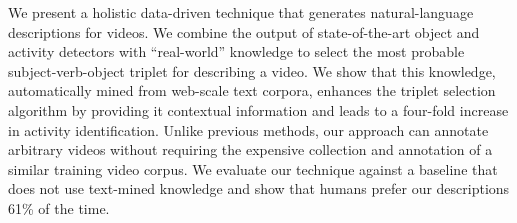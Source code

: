 We present a holistic data-driven technique that generates natural-language descriptions for videos. We combine the output of state-of-the-art object and
 activity detectors with ``real-world'' knowledge to select the most probable
 subject-verb-object triplet for describing a video. We show that this
 knowledge, automatically mined from web-scale text corpora, enhances the
 triplet selection algorithm by providing it contextual information and leads to
 a four-fold increase in activity identification. Unlike previous methods, our
 approach can annotate arbitrary videos without requiring the expensive
 collection and annotation of a similar training video corpus. We evaluate our
 technique against a baseline that does not use text-mined knowledge and show
 that humans prefer our descriptions 61\% of the time.

